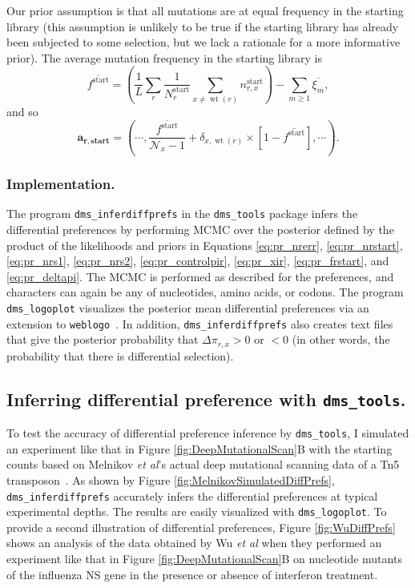 \documentclass[twocolumn]{bmcart}%
\begin{document}
Our prior assumption is that all mutations are at equal frequency in the starting library (this assumption is unlikely to be true if the starting library has already been subjected to some selection, but we lack a rationale for a more informative prior). The average mutation frequency in the starting library is
\begin{equation}
\label{eq:avgfstart}
\overline{f^{\textrm{start}}} = \left(\frac{1}{L}\sum\limits_r \frac{1}{N_r^{\textrm{start}}}\sum\limits_{x\ne \operatorname{wt}\left(r\right)} n_{r,x}^{\textrm{start}}\right) - \sum\limits_{m \ge 1} \overline{\xi_m},
\end{equation}
and so 
\begin{equation}
\label{eq:arstart}
\boldsymbol{\mathbf{a_{r,\textbf{start}}}}= \left(\cdots, \frac{\overline{f^{\textrm{start}}}}{\mathcal{N}_x - 1} + \delta_{x,\operatorname{wt}\left(r\right)} \times \left[1 - \overline{f^{\textrm{start}}}\right] ,\cdots\right).
\end{equation}

\subsubsection*{Implementation.}
The program \texttt{dms\_inferdiffprefs} in the \texttt{dms\_tools} package infers the differential preferences by performing MCMC over the posterior defined by the product of the likelihoods and priors in Equations \ref{eq:pr_nrerr}, \ref{eq:pr_nrstart}, \ref{eq:pr_nrs1}, \ref{eq:pr_nrs2}, \ref{eq:pr_controlpir}, \ref{eq:pr_xir}, \ref{eq:pr_frstart}, and \ref{eq:pr_deltapi}. The MCMC is performed as described for the preferences, and characters can again be any of nucleotides, amino acids, or codons. The program \texttt{dms\_logoplot} visualizes the posterior mean differential preferences via an extension to \texttt{weblogo}~\cite{crooks2004}. In addition, \texttt{dms\_inferdiffprefs} also creates text files that give the posterior probability that $\Delta\pi_{r,x} > 0$ or $< 0$ (in other words, the probability that there is differential selection).

\subsection*{Inferring differential preference with \texttt{dms\_tools}.}
To test the accuracy of differential preference inference by \texttt{dms\_tools}, I simulated an experiment like that in Figure \ref{fig:DeepMutationalScan}B with the starting counts based on Melnikov \textit{et al}'s actual deep mutational scanning data of a Tn5 transposon~\cite{melnikov2014comprehensive}. As shown by Figure \ref{fig:MelnikovSimulatedDiffPrefs}, \texttt{dms\_inferdiffprefs} accurately infers the differential preferences at typical experimental depths. The results are easily visualized with \texttt{dms\_logoplot}. To provide a second illustration of differential preferences, Figure \ref{fig:WuDiffPrefs} shows an analysis of the data obtained by Wu \textit{et al} when they performed an experiment like that in Figure \ref{fig:DeepMutationalScan}B on nucleotide mutants of the influenza NS gene in the presence or absence of interferon treatment.
\end{document}
